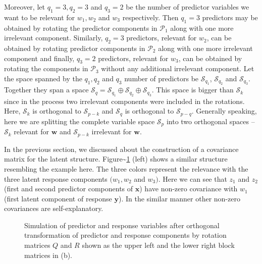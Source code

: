\documentclass[3p,times,12pt,authoryear]{elsarticle}
\theoremstyle{definition}
\theoremstyle{definition}
\theoremstyle{remark}
\begin{document}
Moreover, let \(q_1 = 3, q_2 = 3\) and \(q_3 = 2\) be the number of
predictor variables we want to be relevant for \(w_1, w_2\) and \(w_3\)
respectively. Then \(q_1 = 3\) predictors may be obtained by rotating
the predictor components in \(\mathcal{P}_1\) along with one more
irrelevant component. Similarly, \(q_2 = 3\) predictors, relevant for
\(w_2\), can be obtained by rotating predictor components in
\(\mathcal{P}_2\) along with one more irrelevant component and finally,
\(q_3 = 2\) predictors, relevant for \(w_3\), can be obtained by
rotating the components in \(\mathcal{P}_3\) without any additional
irrelevant component. Let the space spanned by the \(q_1, q_2\) and
\(q_3\) number of predictors be \(\mathcal{S}_{q_1}\),
\(\mathcal{S}_{q_2}\) and \(\mathcal{S}_{q_3}\). Together they span a
space
\(\mathcal{S}_q = \mathcal{S}_{q_1} \oplus \mathcal{S}_{q_2} \oplus \mathcal{S}_{q_3}\).
This space is bigger than \(\mathcal{S}_k\) since in the process two
irrelevant components were included in the rotations. Here,
\(\mathcal{S}_k\) is orthogonal to \(\mathcal{S}_{p - k}\) and
\(\mathcal{S}_q\) is orthogonal to \(\mathcal{S}_{p - q}\). Generally
speaking, here we are splitting the complete variable space
\(\mathcal{S}_p\) into two orthogonal spaces -- \(\mathcal{S}_k\)
relevant for \(\mathbf{w}\) and \(\mathcal{S}_{p - k}\) irrelevant for
\(\mathbf{w}\).

In the previous section, we discussed about the construction of a
covariance matrix for the latent structure.
Figure\textasciitilde{}\ref{fig:cov-plot-print} (left) shows a similar
structure resembling the example here. The three colors represent the
relevance with the three latent response components \((w_1, w_2\) and
\(w_3)\). Here we can see that \(z_{1}\) and \(z_{2}\) (first and second
predictor components of \(\mathbf{x}\)) have non-zero covariance with
\(w_1\) (first latent component of response \(\mathbf{y}\)). In the
similar manner other non-zero covariances are self-explanatory.

\begin{figure}[!htb]
\caption{Simulation of predictor and response variables after orthogonal transformation of predictor and response components by rotation matrices $Q$ and $R$ shown as the upper left and the lower right block matrices in (b).}\label{fig:cov-plot-print}
\end{figure}
\end{document}
